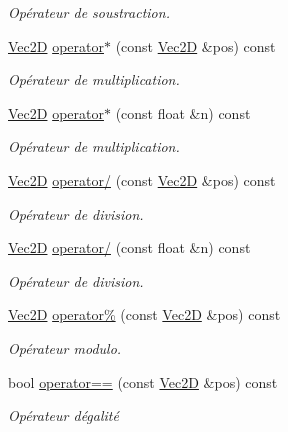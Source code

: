 \begin{DoxyCompactItemize}
\begin{DoxyCompactList}\small\item\em Opérateur de soustraction. \end{DoxyCompactList}\item 
\hyperlink{classns_graphics_1_1_vec2_d}{Vec2D} \hyperlink{classns_graphics_1_1_vec2_d_afed7035dfbafeffbfac737fb39d4fb90}{operator$\ast$} (const \hyperlink{classns_graphics_1_1_vec2_d}{Vec2D} \&pos) const
\begin{DoxyCompactList}\small\item\em Opérateur de multiplication. \end{DoxyCompactList}\item 
\hyperlink{classns_graphics_1_1_vec2_d}{Vec2D} \hyperlink{classns_graphics_1_1_vec2_d_a7eb4139a171785d5f2f337cee77b9fb0}{operator$\ast$} (const float \&n) const
\begin{DoxyCompactList}\small\item\em Opérateur de multiplication. \end{DoxyCompactList}\item 
\hyperlink{classns_graphics_1_1_vec2_d}{Vec2D} \hyperlink{classns_graphics_1_1_vec2_d_aaabc44f047e46433d0115fbc49b3ae2f}{operator/} (const \hyperlink{classns_graphics_1_1_vec2_d}{Vec2D} \&pos) const
\begin{DoxyCompactList}\small\item\em Opérateur de division. \end{DoxyCompactList}\item 
\hyperlink{classns_graphics_1_1_vec2_d}{Vec2D} \hyperlink{classns_graphics_1_1_vec2_d_ae3adeb741fa6137acf0edbcf02ca58af}{operator/} (const float \&n) const
\begin{DoxyCompactList}\small\item\em Opérateur de division. \end{DoxyCompactList}\item 
\hyperlink{classns_graphics_1_1_vec2_d}{Vec2D} \hyperlink{classns_graphics_1_1_vec2_d_a43281403abbad9948eacca4d37fc61dc}{operator\%} (const \hyperlink{classns_graphics_1_1_vec2_d}{Vec2D} \&pos) const
\begin{DoxyCompactList}\small\item\em Opérateur modulo. \end{DoxyCompactList}\item 
bool \hyperlink{classns_graphics_1_1_vec2_d_a94b4b8420a450dd284311c49cb0b2e6b}{operator==} (const \hyperlink{classns_graphics_1_1_vec2_d}{Vec2D} \&pos) const
\begin{DoxyCompactList}\small\item\em Opérateur d\textquotesingle{}égalité \end{DoxyCompactList}\item 

\end{DoxyCompactItemize}

